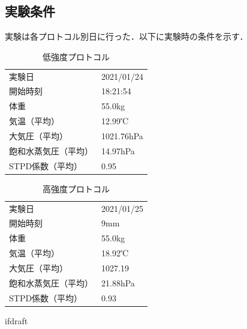 \subsection{実験条件}

実験は各プロトコル別日に行った．以下に実験時の条件を示す．

\begin{table}[H]
  \begin{center}
  \caption{低強度プロトコル}
  \label{tb:light_experiment}
    \begin{tabular}{ll}
      実験日 & 2021/01/24 \\
      開始時刻 & 18:21:54 \\
      体重 & 55.0kg \\
      気温（平均） & 12.99℃ \\
      大気圧（平均） & 1021.76hPa \\
      飽和水蒸気圧（平均） & 14.97hPa　\\
      STPD係数（平均） & 0.95
    \end{tabular}
  \end{center}
\end{table}

\begin{table}[H]
  \begin{center}
  \caption{高強度プロトコル}
  \label{tb:hard_experiment}
    \begin{tabular}{ll}
      実験日 & 2021/01/25 \\
      開始時刻 & 9mm \\
      体重 & 55.0kg \\
      気温（平均） & 18.92℃ \\
      大気圧（平均） & 1027.19 \\
      飽和水蒸気圧（平均） & 21.88hPa　\\
      STPD係数（平均） & 0.93
    \end{tabular}
  \end{center}
\end{table}

\expandafter\ifx\csname ifdraft\endcsname\relax
  
\fi
